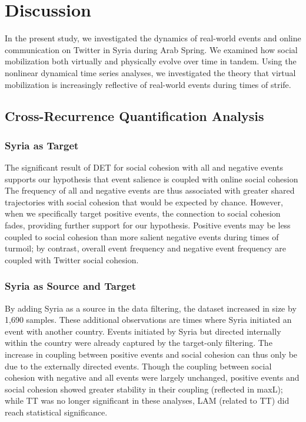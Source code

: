 \documentclass[english,man]{apa6}
\begin{document}
\hypertarget{discussion}{%
\section{Discussion}\label{discussion}}

In the present study, we investigated the dynamics of real-world events
and online communication on Twitter in Syria during Arab Spring. We examined
how social mobilization both virtually and physically evolve over time in
tandem. Using the
nonlinear dynamical time series analyses, we investigated the theory that
virtual mobilization is increasingly reflective of real-world events
during times of strife.

\hypertarget{cross-recurrence-quantification-analysis-2}{%
\subsection{Cross-Recurrence Quantification Analysis}\label{cross-recurrence-quantification-analysis-2}}

\hypertarget{syria-as-target-2}{%
\subsubsection{Syria as Target}\label{syria-as-target-2}}

The significant result of DET for social cohesion with all and negative
events supports our hypothesis that
event salience is coupled with online social cohesion The frequency
of all and negative events are thus associated with greater
shared trajectories with social cohesion that would be expected by chance.
However, when we specifically target positive events, the connection
to social cohesion fades, providing further
support for our hypothesis. Positive events
may be less coupled to social cohesion than more salient negative events
during times of turmoil; by contrast, overall event frequency and
negative event frequency are coupled with Twitter social cohesion.

\hypertarget{syria-as-source-and-target-2}{%
\subsubsection{Syria as Source and Target}\label{syria-as-source-and-target-2}}

By adding Syria as a source in the data filtering, the dataset increased
in size by 1,690 samples. These additional observations are times where
Syria initiated an event with another country. Events initiated by Syria
but directed internally within the country were already captured by the
target-only filtering. The increase in coupling between positive events
and social cohesion can thus only be due to the externally
directed events. Though the coupling between social cohesion with
negative and all events were largely unchanged,
positive events and social cohesion showed greater stability
in their coupling (reflected in maxL); while TT was no longer
significant in these analyses, LAM (related to TT) did
reach statistical significance.
\end{document}

